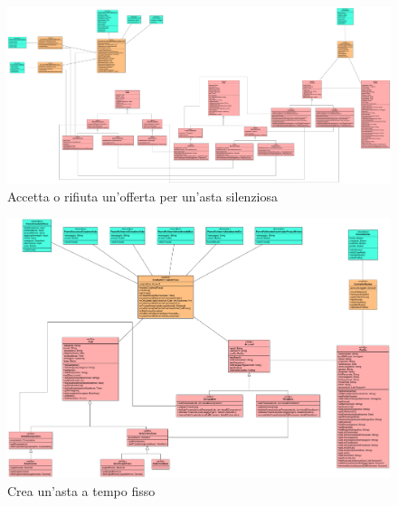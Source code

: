             \begin{figure}[htbp!]
                \centering
                    \includegraphics[width=1\linewidth]{Immagini/Diagrammi/Class Diagram/Analisi/Venditore e compratore/AccettaRifiutaOffertaSilenziosa.pdf}
                \caption{Accetta o rifiuta un'offerta per un'asta silenziosa}
            \end{figure}
            
            \begin{figure}[htbp!]
                \centering
                    \includegraphics[width=1\linewidth]{Immagini/Diagrammi/Class Diagram/Analisi/Venditore e compratore/CreaAstaFissa.pdf}
                \caption{Crea un'asta a tempo fisso}
            \end{figure}
            
